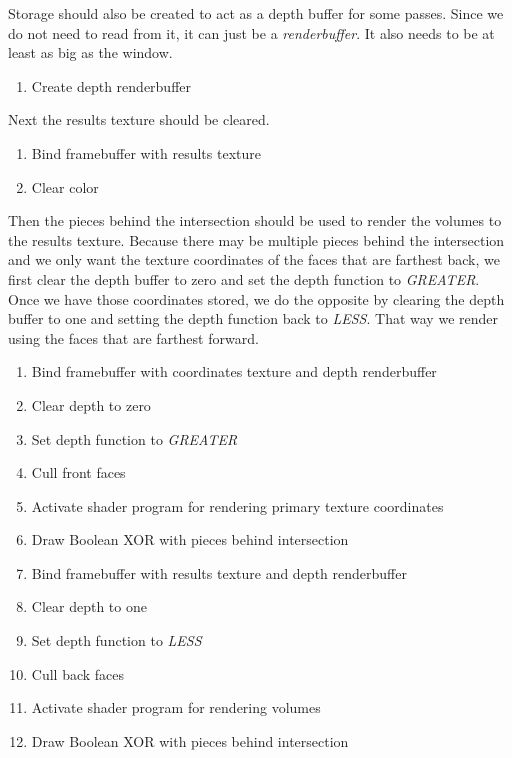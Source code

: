 \documentclass{report}
\begin{document}
Storage should also be created to act as a depth buffer for some passes.  Since
we do not need to read from it, it can just be a \emph{renderbuffer}.  It also
needs to be at least as big as the window.

\begin{enumerate}
  \item Create depth renderbuffer
\end{enumerate}

Next the results texture should be cleared.

\begin{enumerate}
  \item Bind framebuffer with results texture
  \item Clear color
\end{enumerate}

Then the pieces behind the intersection should be used to render the volumes to
the results texture.  Because there may be multiple pieces behind the
intersection and we only want the texture coordinates of the faces that are
farthest back, we first clear the depth buffer to zero and set the depth
function to \emph{GREATER}.  Once we have those coordinates stored, we do the
opposite by clearing the depth buffer to one and setting the depth function back
to \emph{LESS}.  That way we render using the faces that are farthest forward.

\begin{enumerate}
  \item Bind framebuffer with coordinates texture and depth renderbuffer
  \item Clear depth to zero
  \item Set depth function to \emph{GREATER}
  \item Cull front faces
  \item Activate shader program for rendering primary texture coordinates
  \item Draw Boolean XOR with pieces behind intersection
  \item Bind framebuffer with results texture and depth renderbuffer
  \item Clear depth to one
  \item Set depth function to \emph{LESS}
  \item Cull back faces
  \item Activate shader program for rendering volumes
  \item Draw Boolean XOR with pieces behind intersection
\end{enumerate}
\end{document}

